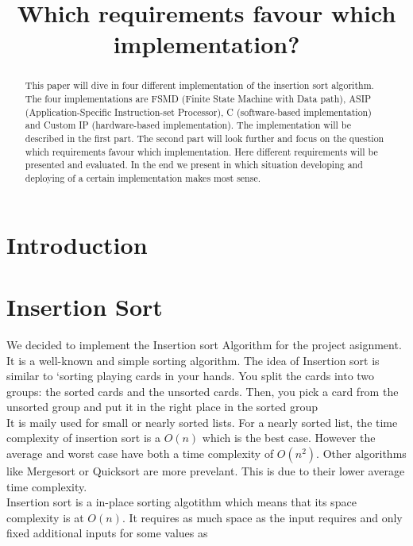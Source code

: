\documentclass[conference]{IEEEtran}
\begin{document}
\title{Which requirements favour which implementation? \\}

\maketitle

\begin{abstract}
This paper will dive in four different implementation of the insertion sort algorithm. The four implementations are FSMD (Finite State Machine with Data path), ASIP (Application-Specific Instruction-set Processor), C (software-based implementation) and Custom IP (hardware-based implementation). The implementation will be described in the first part. The second part will look further and focus on the question which requirements favour which implementation. Here different requirements will be presented and evaluated. In the end we present in which situation developing and deploying of a certain implementation makes most sense. 
\end{abstract}

\section{Introduction}

\section{Insertion Sort}
We decided to implement the Insertion sort Algorithm for the project asignment. It is a well-known and simple sorting algorithm. The idea of Insertion sort is similar to `sorting playing cards in your hands. You split the cards into two groups: the sorted cards and the unsorted cards. Then, you pick a card from the unsorted group and put it in the right place in the sorted group~\cite{g4g}\\
It is maily used for small or nearly sorted lists. For a nearly sorted list, the time complexity of insertion sort is a $O(n)$ which is the best case. However the average and worst case have both a time complexity of $O(n^2)$. Other algorithms like Mergesort or Quicksort are more prevelant. This is due to their lower average time complexity.\\
Insertion sort is a in-place sorting algotithm which means that its space complexity is at $O(n)$. It requires as much space as the input requires and only fixed additional inputs for some values as 
\end{document}
